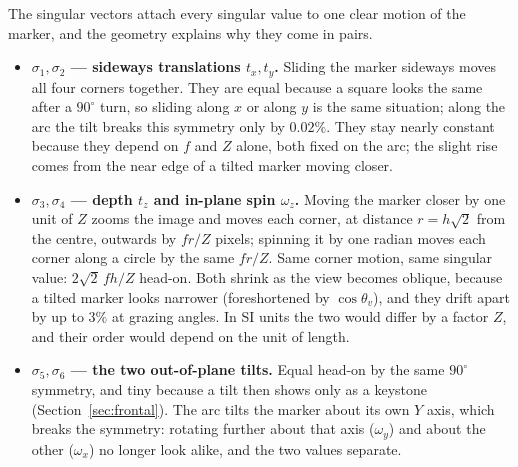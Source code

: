 \documentclass[11pt,a4paper]{article}
\theoremstyle{remark}
\begin{document}
The singular vectors attach every singular value to one clear motion of the
marker, and the geometry explains why they come in pairs.
\begin{itemize}[leftmargin=*]
  \item \textbf{$\sigma_1,\sigma_2$ --- sideways translations $t_x,t_y$.}
        Sliding the marker sideways moves all four corners together. They are
        equal because a square looks the same after a $90^{\circ}$ turn, so
        sliding along $x$ or along $y$ is the same situation; along the arc the
        tilt breaks this symmetry only by $0.02\%$. They stay nearly constant
        because they depend on $f$ and $Z$ alone, both fixed on the arc; the
        slight rise comes from the near edge of a tilted marker moving closer.
  \item \textbf{$\sigma_3,\sigma_4$ --- depth $t_z$ and in-plane spin
        $\omega_z$.} Moving the marker closer by one unit of $Z$ zooms the image
        and moves each corner, at distance $r = h\sqrt2$ from the centre,
        outwards by $f r/Z$ pixels; spinning it by one radian moves each corner
        along a circle by the same $f r/Z$. Same corner motion, same singular
        value: $2\sqrt2\,fh/Z$ head-on. Both shrink as the view becomes oblique,
        because a tilted marker looks narrower (foreshortened by
        $\cos\theta_v$), and they drift apart by up to $3\%$ at grazing angles.
        In SI units the two would differ by a factor $Z$, and their order would
        depend on the unit of length.
  \item \textbf{$\sigma_5,\sigma_6$ --- the two out-of-plane tilts.} Equal
        head-on by the same $90^{\circ}$ symmetry, and tiny because a tilt then
        shows only as a keystone (Section~\ref{sec:frontal}). The arc tilts the
        marker about its own $Y$ axis, which breaks the symmetry: rotating
        further about that axis ($\omega_y$) and about the other ($\omega_x$) no
        longer look alike, and the two values separate.
\end{itemize}
\end{document}
